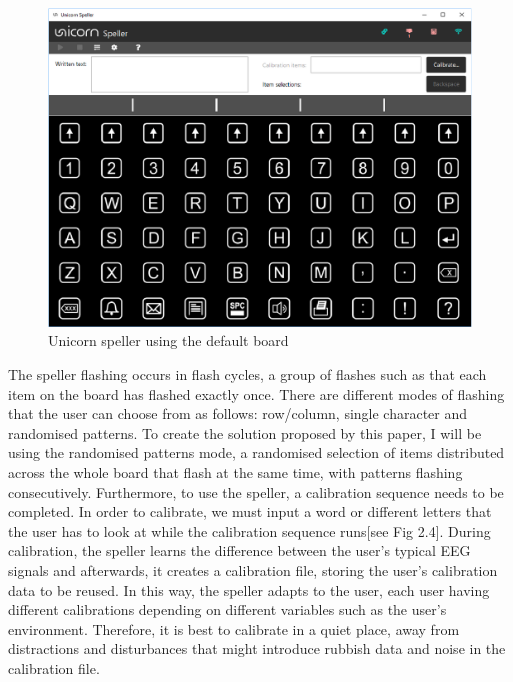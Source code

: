 \begin{figure}[H]
  \centering
  \includegraphics[width=1\textwidth]{Graphics/Speller.png}
  \caption{Unicorn speller using the default board}
\end{figure}

The speller flashing occurs in flash cycles, a group of flashes such as that each item on the board has flashed exactly once. There are different modes of flashing that the user can choose from as follows: row/column, single character and randomised patterns. To create the solution proposed by this paper, I will be using the randomised patterns mode, a randomised selection of items distributed across the whole board that flash at the same time, with patterns flashing consecutively\cite{UnicornSuite_Manual}. 
\vspace{\baselineskip}\newline
Furthermore, to use the speller, a calibration sequence needs to be completed. In order to calibrate, we must input a word or different letters that the user has to look at while the calibration sequence runs[see Fig 2.4]. During calibration, the speller learns the difference between the user's typical EEG signals and afterwards, it creates a calibration file, storing the user's calibration data to be reused. In this way, the speller adapts to the user, each user having different calibrations depending on different variables such as the user's environment. Therefore, it is best to calibrate in a quiet place, away from distractions and disturbances that might introduce rubbish data and noise in the calibration file.

